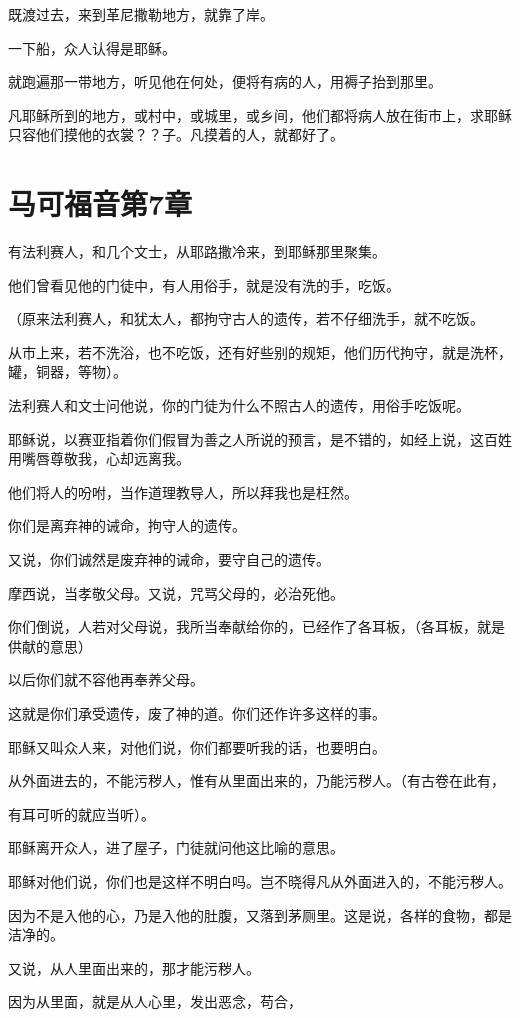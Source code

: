 \documentclass[12pt,oneside]{book}
\begin{document}
既渡过去，来到革尼撒勒地方，就靠了岸。

一下船，众人认得是耶稣。

就跑遍那一带地方，听见他在何处，便将有病的人，用褥子抬到那里。

凡耶稣所到的地方，或村中，或城里，或乡间，他们都将病人放在街市上，求耶稣只容他们摸他的衣裳？？子。凡摸着的人，就都好了。

\chapter{马可福音第7章}
有法利赛人，和几个文士，从耶路撒冷来，到耶稣那里聚集。

他们曾看见他的门徒中，有人用俗手，就是没有洗的手，吃饭。

（原来法利赛人，和犹太人，都拘守古人的遗传，若不仔细洗手，就不吃饭。

从市上来，若不洗浴，也不吃饭，还有好些别的规矩，他们历代拘守，就是洗杯，罐，铜器，等物）。

法利赛人和文士问他说，你的门徒为什么不照古人的遗传，用俗手吃饭呢。

耶稣说，以赛亚指着你们假冒为善之人所说的预言，是不错的，如经上说，这百姓用嘴唇尊敬我，心却远离我。

他们将人的吩咐，当作道理教导人，所以拜我也是枉然。

你们是离弃神的诫命，拘守人的遗传。

又说，你们诚然是废弃神的诫命，要守自己的遗传。

摩西说，当孝敬父母。又说，咒骂父母的，必治死他。

你们倒说，人若对父母说，我所当奉献给你的，已经作了各耳板，（各耳板，就是供献的意思）

以后你们就不容他再奉养父母。

这就是你们承受遗传，废了神的道。你们还作许多这样的事。

耶稣又叫众人来，对他们说，你们都要听我的话，也要明白。

从外面进去的，不能污秽人，惟有从里面出来的，乃能污秽人。（有古卷在此有，

有耳可听的就应当听）。

耶稣离开众人，进了屋子，门徒就问他这比喻的意思。

耶稣对他们说，你们也是这样不明白吗。岂不晓得凡从外面进入的，不能污秽人。

因为不是入他的心，乃是入他的肚腹，又落到茅厕里。这是说，各样的食物，都是洁净的。

又说，从人里面出来的，那才能污秽人。

因为从里面，就是从人心里，发出恶念，苟合，
\end{document}
